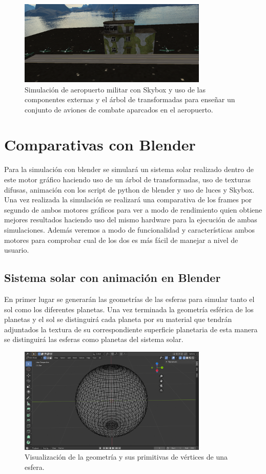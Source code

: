 \documentclass[a4paper]{book}
\begin{document}
\begin{figure}[H]
    \centering
    \includegraphics[width=9cm, keepaspectratio]{img/AirportMultiplePlanes.png}
    \caption{Simulación de aeropuerto militar con Skybox y uso de las componentes externas y el árbol de transformadas para enseñar un
    conjunto de aviones de combate aparcados en el aeropuerto.}
    \label{AirportMultiplePlanes}
\end{figure}

\section{Comparativas con Blender}
\label{sec:BlenderComp}

Para la simulación con blender se simulará un sistema solar realizado dentro de este motor gráfico haciendo uso de un árbol de transformadas,
uso de texturas difusas, animación con los script de python de blender y uso de luces y Skybox. Una vez realizada la  simulación se realizará
una comparativa de los frames por segundo de ambos motores gráficos para ver a modo de rendimiento quien obtiene mejores resultados haciendo
uso del mismo hardware para la ejecución de ambas simulaciones. Además veremos a modo de funcionalidad y características ambos motores para
comprobar cual de los dos es más fácil de manejar a nivel de usuario.

\subsection{Sistema solar con animación en Blender}
\label{subsec:BlenderComp}

En primer lugar se generarán las geometrías de las esferas para simular tanto el sol como los diferentes planetas. Una vez terminada
la geometría esférica de los planetas y el sol se distinguirá cada planeta por su material que tendrán adjuntados la textura de su
correspondiente superficie planetaria de esta manera se distinguirá las esferas como planetas del sistema solar.

\begin{figure}[H]
    \centering
    \includegraphics[width=9cm, keepaspectratio]{img/Geometry.png}
    \caption{Visualización de la geometría y sus primitivas de vértices de una esfera.}
    \label{Geometry}
\end{figure}
\end{document}
